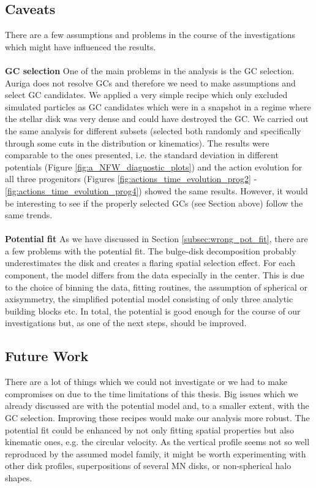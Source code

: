 \subsection{Caveats}
There are a few assumptions and problems in the course of the investigations which might have influenced the results.
\\\\\textbf{GC selection}
One of the main problems in the analysis is the \ac{GC} selection. Auriga does not resolve \acp{GC} and therefore we need to make assumptions and select \ac{GC} candidates. We applied a very simple recipe which only excluded simulated particles as \ac{GC} candidates which were in a snapshot in a regime where the stellar disk was very dense and could have destroyed the \ac{GC}. We carried out the same analysis for different subsets (selected both randomly and specifically through some cuts in the distribution or kinematics). The results were comparable to the ones presented, i.e. the standard deviation in different potentials (Figure \ref{fig:a_NFW_diagnostic_plots}) and the action evolution for all three progenitors (Figures \ref{fig:actions_time_evolution_prog2} - \ref{fig:actions_time_evolution_prog4}) showed the same results. However, it would be interesting to see if the properly selected \acp{GC} (see Section above) follow the same trends.
\\\\\textbf{Potential fit}
As we have discussed in Section \ref{subsec:wrong_pot_fit}, there are a few problems with the potential fit. The bulge-disk decomposition probably underestimates the disk and creates a flaring spatial selection effect. For each component, the model differs from the data especially in the center. This is due to the choice of binning the data, fitting routines, the assumption of spherical or axisymmetry, the simplified potential model consisting of only three analytic building blocks etc. In total, the potential is good enough for the course of our investigations but, as one of the next steps, should be improved.

\subsection{Future Work}
There are a lot of things which we could not investigate or we had to make compromises on due to the time limitations of this thesis. Big issues which we already discussed are with the potential model and, to a smaller extent, with the \ac{GC} selection. Improving these recipes would make our analysis more robust. The potential fit could be enhanced by not only fitting spatial properties but also kinematic ones, e.g. the circular velocity. As the vertical profile seems not so well reproduced by the assumed model family, it might be worth experimenting with other disk profiles, superpositions of several \ac{MN} disks, or non-spherical halo shapes.

